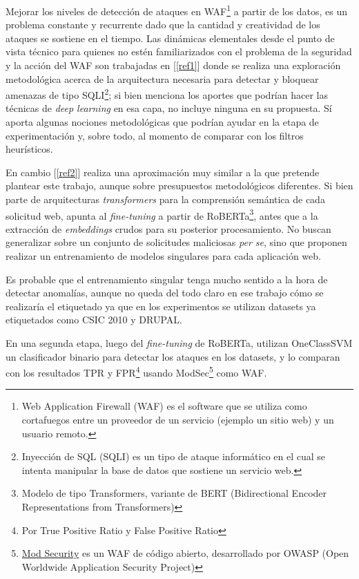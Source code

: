 \documentclass[12pt,a4paper]{article}
\begin{document}
Mejorar los niveles de detección de ataques en WAF\footnote{Web Application Firewall (WAF) es el software que se utiliza como cortafuegos entre un proveedor de un servicio (ejemplo un sitio web) y un usuario remoto.} a partir de los datos, es un problema constante y recurrente dado que la cantidad y creatividad de los ataques se sostiene en el tiempo. Las dinámicas elementales desde el punto de vista técnico para quienes no estén familiarizados con el problema de la seguridad y la acción del WAF son trabajadas en [\ref{ref1}] donde se realiza una exploración metodológica acerca de la arquitectura necesaria para detectar y bloquear amenazas de tipo SQLI\footnote{Inyección de SQL (SQLI) es un tipo de ataque informático en el cual se intenta manipular la base de datos que sostiene un servicio web.}; si bien menciona los aportes que podrían hacer las técnicas de \textit{deep learning} en esa capa, no incluye ninguna en su propuesta. Sí aporta algunas nociones metodológicas que podrían ayudar en la etapa de experimentación y, sobre todo, al momento de comparar con los filtros heurísticos.

En cambio [\ref{ref2}] realiza una aproximación muy similar a la que pretende plantear este trabajo, aunque sobre presupuestos metodológicos diferentes. Si bien parte de arquitecturas \textit{transformers} para la comprensión semántica de cada solicitud web, apunta al \textit{fine-tuning} a partir de RoBERTa\footnote{Modelo de tipo Transformers, variante de BERT (Bidirectional Encoder Representations from Transformers)}, antes que a la extracción de \textit{embeddings} crudos para su posterior procesamiento. No buscan generalizar sobre un conjunto de solicitudes maliciosas \textit{per se}, sino que proponen realizar un entrenamiento de modelos singulares para cada aplicación web.

Es probable que el entrenamiento singular tenga mucho sentido a la hora de detectar anomalías, aunque no queda del todo claro en ese trabajo cómo se realizaría el etiquetado ya que en los experimentos se utilizan datasets ya etiquetados como CSIC 2010 y DRUPAL.

En una segunda etapa, luego del \textit{fine-tuning} de RoBERTa, utilizan OneClassSVM un clasificador binario para detectar los ataques en los datasets, y lo comparan con los resultados TPR y FPR\footnote{Por True Positive Ratio y False Positive Ratio} usando ModSec\footnote{\href{https://en.wikipedia.org/wiki/ModSecurity}{Mod Security} es un WAF de código abierto, desarrollado por OWASP (Open Worldwide Application Security Project)} como WAF.
\end{document}
